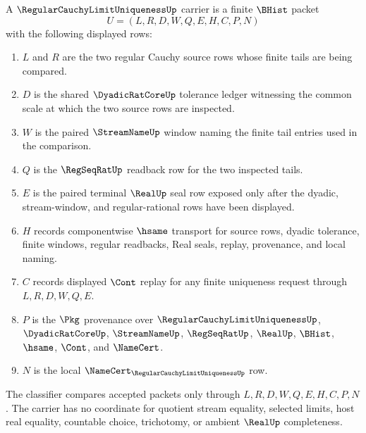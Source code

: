 \begin{definition}
\label{def:regular-cauchy-limit-uniqueness-carrier}
A $\RegularCauchyLimitUniquenessUp$ carrier is a finite $\BHist$ packet
$$
U=(L,R,D,W,Q,E,H,C,P,N)
$$
with the following displayed rows:
\begin{enumerate}
\item $L$ and $R$ are the two regular Cauchy source rows whose finite tails are being compared.
\item $D$ is the shared $\DyadicRatCoreUp$ tolerance ledger witnessing the common scale at which the two source rows are inspected.
\item $W$ is the paired $\StreamNameUp$ window naming the finite tail entries used in the comparison.
\item $Q$ is the $\RegSeqRatUp$ readback row for the two inspected tails.
\item $E$ is the paired terminal $\RealUp$ seal row exposed only after the dyadic, stream-window, and regular-rational rows have been displayed.
\item $H$ records componentwise $\hsame$ transport for source rows, dyadic tolerance, finite windows, regular readbacks, Real seals, replay, provenance, and local naming.
\item $C$ records displayed $\Cont$ replay for any finite uniqueness request through $L,R,D,W,Q,E$.
\item $P$ is the $\Pkg$ provenance over $\RegularCauchyLimitUniquenessUp$, $\DyadicRatCoreUp$, $\StreamNameUp$, $\RegSeqRatUp$, $\RealUp$, $\BHist$, $\hsame$, $\Cont$, and $\NameCert$.
\item $N$ is the local $\NameCert_{\RegularCauchyLimitUniquenessUp}$ row.
\end{enumerate}
The classifier compares accepted packets only through $L,R,D,W,Q,E,H,C,P,N$. The carrier has no coordinate for quotient stream equality, selected limits, host real equality, countable choice, trichotomy, or ambient $\RealUp$ completeness.
\end{definition}

